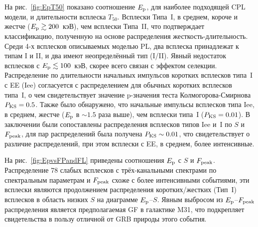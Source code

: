 На рис.~\ref{fig:EpT50} показано соотношение $E_{\mathrm{p}}$, для наиболее подходящей CPL модели,
и длительности всплеска $T_{50}$. Всплески Типа~I, в среднем, короче и жестче 
($E_{\mathrm{p}}\gtrsim 200$~кэВ), чем всплески Типа~II, что подтверждает классификацию,
полученную на основе распределения жесткость-длительность.
Среди 4-х всплесков описываемых моделью PL, два всплеска принадлежат к типам I и II,
и два имеют неопределённый тип (I/II). Явный недостаток всплесков с $E_{\mathrm{p}}\lesssim 100$~кэВ,
скорее всего связан с эффектом селекции. 
Распределение по длительности начальных импульсов коротких всплесков типа~I с EE (Iee) согласуется с 
распределением для обычных коротких всплесков типа~I, о чем свидетельствует значение p-значения
теста Колмогорова-Смирнова $P_{\mathrm{KS}}=0.5$. Также было обнаружено, что
начальные импульсы всплесков типа Iee, в среднем, жестче ($E_{\mathrm{p}}$ в $\sim 1.5$ раза выше),
чем всплески типа~I ($P_{\mathrm{KS}} = 0.01$). В заключении были сопоставлены распределения 
всплесков типов Iee и~I по $S$ и $F_{\mathrm{peak}}$, для пар распределений 
была получена $P_{\mathrm{KS}} \sim 0.01$, что свидетельствует о различие распределений,
при этом всплески с EE, в среднем, более интенсивные.

На рис.~\ref{fig:EpvsFPandFL} приведены соотношения $E_{\mathrm{p}}$ с $S$ и $F_{\mathrm{peak}}$.
Распределение 78 слабых всплесков с трёх-канальными спектрами по спектральным параметрам 
и $F_{\mathrm{peak}}$ схоже с более интенсивными событиями, эти всплески являются продолжением
распределения коротких/жестких (Тип~I) всплесков в область низких $S$  на диаграмме $E_{\mathrm{p}}$--$S$.
Явным выбросом из  $E_{\mathrm{p}}$--$F_{\mathrm{peak}}$ распределения является предполагаемая 
GF в галактике M31, что подкрепляет свидетельства в пользу отличной от GRB природы этого события.

